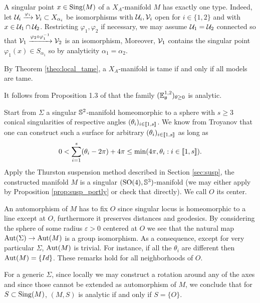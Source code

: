 \begin{rem}
    A singular point $x\in \mathrm{Sing}(M)$ of a $X_A$-manifold $M$ has exactly one type. Indeed, let $\mathcal{U}_i\xrightarrow{\varphi_i} \mathcal V_i\subset X_{\alpha_i}$ be isomorphisms with $\mathcal{U}_i,\mathcal V_i$ open for $i\in \{1,2\}$ and with $x\in \mathcal{U}_1\cap \mathcal{U}_2$. Restricting $\varphi_1,\varphi_2$ if necessary, we may assume $\mathcal{U}_1=\mathcal{U}_2$ connected  so that $\mathcal V_1\xrightarrow{\varphi_2\circ \varphi_1^{-1}}\mathcal V_2$ is an isomorphism, Moreover, $\mathcal V_1$ contains the singular point $\varphi_1(x)\in S_{\alpha_1}$ so by analyticity $\alpha_1=\alpha_2$.
\end{rem}
\begin{rem}
 By Theorem \ref{theo:local_tame}, a $X_A$-manifold is tame if and only if all models are tame.
\end{rem}
\begin{ex} It follows from Proposition 1.3 of  \cite{brunswic2021cauchy} that the family $({\mathbb E}^{1,2}_{\theta})_{\theta\geq 0}$ is analytic.
 
\end{ex}
\begin{cex} Start from $\Sigma$ a singular $\mathbb{S}^2$-manifold homeomorphic to a sphere with $s\geq 3$ conical singularities of respective angles $(\theta_i)_{i\in [\![ 1,s]\!]}$. We know from Troyanov \cite{MR1005085}  that one can construct such a surface for arbitrary  $(\theta_i)_{i\in [\![ 1,s]\!]}$ as long as $$0<\sum_{i=1}^s( \theta_i -2\pi) + 4\pi\leq \min(4\pi, \theta_i : i\in [\![ 1,s]\!]).$$
Apply the Thurston suspension method described in Section \ref{sec:susp}, the constructed manifold $M$ is  a singular $(\mathrm{SO}(4),\mathbb{S}^3)$-manifold (we may either apply  by Proposition \ref{prop:susp_portly}  or check that directly). We call $O$ its center.

An automorphism of $M$ has to fix $O$ since singular locus is homeomorphic to a line except at $O$, furthermore it preserves distances and geodesics. By considering the sphere of some radius $\varepsilon>0$ centered at $O$ we see that the natural map $\mathrm{Aut}(\Sigma)\rightarrow \mathrm{Aut}(M)$ is a group isomorphism.  As a consequence, except for very particular $\Sigma$, $\mathrm{Aut}(M)$ is trivial. For instance, if all the $\theta_i$ are different then $\mathrm{Aut}(M)=\{Id\}$. These remarks hold for all neighborhoods of $O$.

For a generic $\Sigma$, since locally we may construct a rotation around any of the axes and since  those cannot be extended as automorphism of $M$, we conclude that for $S\subset \mathrm{Sing}(M)$, $(M,S)$ is  analytic if and only if $S=\{O\}$.

 
\end{cex}


